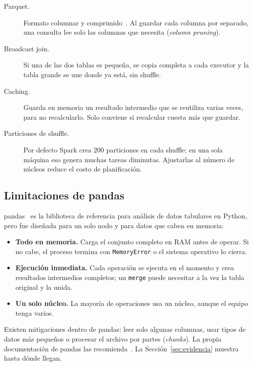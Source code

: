 \documentclass[11pt,a4paper]{article}
\begin{document}
\begin{description}
  \item[Parquet.] Formato columnar y comprimido~\cite{parquet}. Al guardar cada columna por
  separado, una consulta lee solo las columnas que necesita (\emph{column pruning}).
  \item[Broadcast join.] Si una de las dos tablas es pequeña, se copia completa a cada
  executor y la tabla grande se une donde ya está, sin shuffle.
  \item[Caching.] Guarda en memoria un resultado intermedio que se reutiliza varias veces,
  para no recalcularlo. Solo conviene si recalcular cuesta más que guardar.
  \item[Particiones de shuffle.] Por defecto Spark crea 200 particiones en cada shuffle; en
  una sola máquina eso genera muchas tareas diminutas. Ajustarlas al número de núcleos
  reduce el costo de planificación.
\end{description}

\subsection{Limitaciones de pandas}

pandas~\cite{mckinney2010} es la biblioteca de referencia para análisis de datos tabulares
en Python, pero fue diseñada para un solo nodo y para datos que caben en memoria:

\begin{itemize}
  \item \textbf{Todo en memoria.} Carga el conjunto completo en RAM antes de operar. Si no
  cabe, el proceso termina con \texttt{MemoryError} o el sistema operativo lo cierra.
  \item \textbf{Ejecución inmediata.} Cada operación se ejecuta en el momento y crea
  resultados intermedios completos; un \texttt{merge} puede necesitar a la vez la tabla
  original y la unida.
  \item \textbf{Un solo núcleo.} La mayoría de operaciones usa un núcleo, aunque el equipo
  tenga varios.
\end{itemize}

Existen mitigaciones dentro de pandas: leer solo algunas columnas, usar tipos de datos más
pequeños o procesar el archivo por partes (\emph{chunks}). La propia documentación de pandas
las recomienda~\cite{pandasscale}. La Sección~\ref{sec:evidencia} muestra hasta dónde llegan.

\end{document}
